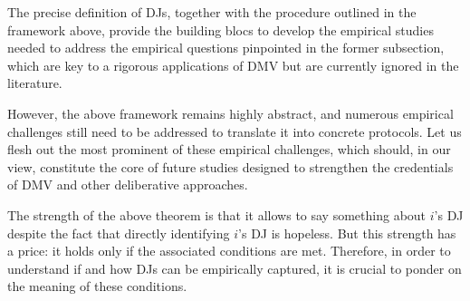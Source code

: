 \documentclass[version=3.21, pagesize, twoside=off, bibliography=totoc, DIV=calc, fontsize=12pt, a4paper, french, english]{scrartcl}
\begin{document}
The precise definition of \acp{DJ}, together with the procedure outlined in the framework above, provide the building blocs to develop the empirical studies needed to address the empirical questions pinpointed in the former subsection, which are key to a rigorous applications of DMV but are currently ignored in the literature.


However, the above framework remains highly abstract, and numerous empirical challenges still need to be addressed to translate it into concrete protocols. Let us flesh out the most prominent of these empirical challenges, which should, in our view, constitute the core of future studies designed to strengthen the credentials of DMV and other deliberative approaches. 

The strength of the above theorem is that it allows to say something about $i$'s \ac{DJ} despite the fact that directly identifying $i$'s \ac{DJ} is hopeless. 
But this strength has a price: it holds only if the associated conditions are met. 
Therefore, in order to understand if and how \acp{DJ} can be empirically captured, it is crucial to ponder on the meaning of these conditions.
\end{document}
